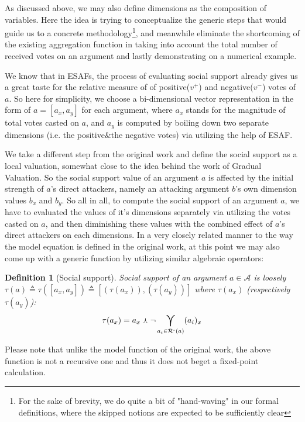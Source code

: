 \documentclass{article}
\newtheorem{definition}{Definition}
\newcommand{\args}{\mathcal{A}} %
\newcommand{\att}{\mathcal{R}}  %
\newcommand{\attackers}[1]{\att^\text{-}\left(#1\right)}
\newcommand{\SAFand}{\curlywedge}     %
\DeclareMathOperator*{\SAFOr}{\bigcurlyvee} %
\begin{document}
As discussed above, we may also define dimensions as the composition of variables. Here the idea is trying to conceptualize the generic steps that would guide us to a concrete methodology\footnote{For the sake of brevity, we do quite a bit of "hand-waving" in our formal definitions, where the skipped notions are expected to be sufficiently clear}, and meanwhile eliminate the shortcoming of the existing aggregation function in taking into account the total number of received votes on an argument and lastly demonstrating on a numerical example.

We know that in ESAFs, the process of evaluating social support already gives us a great taste for the relative measure of  of positive($v^{+}$) and negative($v^{-}$) votes of $a$. So here for simplicity, we choose a bi-dimensional vector representation in the form of $ a = [a_{x}, a_{y}]$ for each argument, where $a_{x}$ stands for the magnitude of total votes casted on $a$, and $a_{y}$ is computed by boiling down two separate dimensions (i.e.  the positive\&the negative votes) via utilizing the help of ESAF.

 We take a different step from the original work and define the social support as a local valuation, somewhat close to the idea behind the work of Gradual Valuation. So the social support value of an argument $a$ is affected by the initial strength of $a$'s direct attackers, namely an attacking argument $b$'s own dimension values $b_{x}$ and $ b_{y}$. So all in all, to compute the social support of an argument $a$, we have to evaluated the values of it's dimensions separately via utilizing the votes casted on $a$, and then diminishing these values with the combined effect of $a$'s direct attackers on each dimensions. In a very closely related manner to the way the model equation is defined in the original work, at this point we may also come up with a generic function by utilizing similar algebraic operators:

\begin{definition}[Social support]
\label{def:ss}
  Social support of an argument  $a \in \args$ is loosely $\tau(a) \triangleq \tau([a_{x}, a_{y}]) \triangleq [(\tau(a_{x})), (\tau(a_{y}))]$ where $\tau(a_{x})$ (respectively $\tau(a_{y})$):
  $$\displaystyle \tau(a_x) = a_{x} \SAFand \lnot \SAFOr_{a_i \in \attackers{a}} (a_{i})_{x}$$
\end{definition}

Please note that unlike the model function of the original work, the above function is not a recursive one and thus it does not beget a fixed-point calculation.
\end{document}
